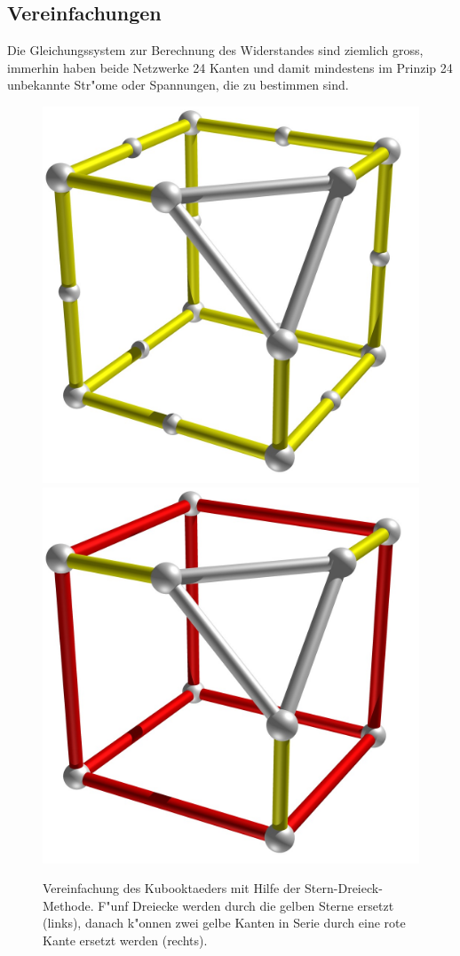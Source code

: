 \documentclass[a4paper,12pt]{article}
\begin{document}
\subsection{Vereinfachungen\label{vereinfachung}}
Die Gleichungssystem zur Berechnung des Widerstandes sind ziemlich gross,
immerhin haben beide Netzwerke 24 Kanten und damit mindestens im Prinzip 
24 unbekannte Str"ome oder Spannungen, die zu bestimmen sind.
\begin{figure}
\centering
\includegraphics[width=0.45\hsize]{vereinfachung.jpg}
\quad
\includegraphics[width=0.45\hsize]{vereinfachung2.jpg}
\caption{Vereinfachung des Kubooktaeders mit Hilfe der Stern-Dreieck-Methode.
F"unf Dreiecke werden durch die gelben Sterne ersetzt (links),
danach k"onnen zwei gelbe Kanten in Serie durch eine rote Kante
ersetzt werden (rechts).
\label{wuerfel}}
\end{figure}
\end{document}
